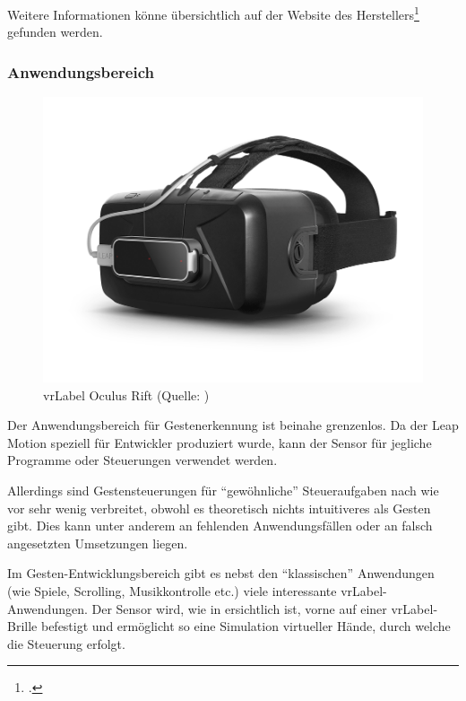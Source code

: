 Weitere Informationen könne übersichtlich auf der Website des Herstellers\footcite{Leap_Motion_Motion_Controller_2015-03-27} gefunden werden.

\subsubsection{Anwendungsbereich}
\begin{figure}
	\includegraphics[width=1.0\linewidth]{images/analysis/leap_vr.png}
	\caption[Oculus Rift VR]{\acrshort{vrLabel} Oculus Rift (Quelle: )}
	\label{fig:leap_vr}
\end{figure}
Der Anwendungsbereich für Gestenerkennung ist beinahe grenzenlos.
Da der Leap Motion speziell für Entwickler produziert wurde, kann der Sensor für jegliche Programme oder Steuerungen verwendet werden.

Allerdings sind Gestensteuerungen für "`gewöhnliche"' Steueraufgaben nach wie vor sehr wenig verbreitet, obwohl es theoretisch nichts intuitiveres als Gesten gibt.
Dies kann unter anderem an fehlenden Anwendungsfällen oder an falsch angesetzten Umsetzungen liegen.

Im Gesten-Entwicklungsbereich gibt es nebst den "`klassischen"' Anwendungen (wie Spiele, Scrolling, Musikkontrolle etc.) viele interessante  \gls{vrLabel}-Anwendungen. Der Sensor wird, wie in  ersichtlich ist, vorne auf einer \gls{vrLabel}-Brille befestigt und ermöglicht so eine Simulation virtueller Hände, durch welche die Steuerung erfolgt.

